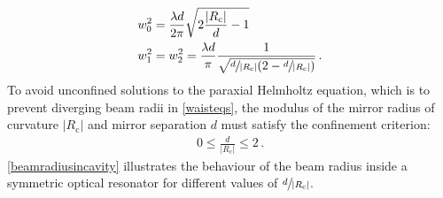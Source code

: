 \documentclass[../Thesis-IJspeert.tex]{subfiles}
\begin{document}
\begin{align}
	\label{waisteqs}
	\begin{split}
		&w_0^2 = \frac{\lambda d}{2\pi}\sqrt{2\frac{\lvert R_\mathrm{c} \rvert}{d} - 1}\\
		&w_1^2 = w_2^2 = \frac{\lambda d}{\pi} \frac{1}{\sqrt{\sfrac{d}{\lvert R_\mathrm{c} \rvert}\left( 2 - \sfrac{d}{\lvert R_\mathrm{c} \rvert} \right)}}\,.
	\end{split}
\end{align}
To avoid unconfined solutions to the paraxial Helmholtz equation, which is to prevent diverging beam radii in \autoref{waisteqs}, the modulus of the mirror radius of curvature $\lvert R_\mathrm{c} \rvert$ and mirror separation $d$ must satisfy the confinement criterion:
\begin{align}
	0 \le \frac{d}{\lvert R_\mathrm{c} \rvert} \le 2\,.
\end{align}
\autoref{beamradiusincavity} illustrates the behaviour of the beam radius inside a symmetric optical resonator for different values of $\sfrac{d}{\lvert R_\mathrm{c} \rvert}$.
\end{document}

